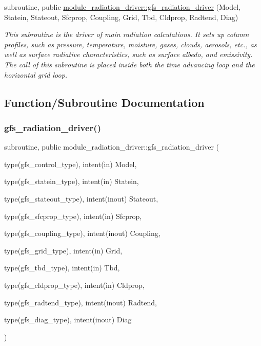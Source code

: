 \begin{DoxyCompactItemize}
\item 
subroutine, public \hyperlink{group__module__radiation__driver_ga9c5872d3bd177315e79977d40245a99a}{module\+\_\+radiation\+\_\+driver\+::gfs\+\_\+radiation\+\_\+driver} (Model, Statein, Stateout, Sfcprop, Coupling, Grid, Tbd, Cldprop, Radtend, Diag)
\begin{DoxyCompactList}\small\item\em This subroutine is the driver of main radiation calculations. It sets up column profiles, such as pressure, temperature, moisture, gases, clouds, aerosols, etc., as well as surface radiative characteristics, such as surface albedo, and emissivity. The call of this subroutine is placed inside both the time advancing loop and the horizontal grid loop. \end{DoxyCompactList}\end{DoxyCompactItemize}


\subsection{Function/\+Subroutine Documentation}
\mbox{\label{group__module__radiation__driver_ga9c5872d3bd177315e79977d40245a99a}} 
\subsubsection{\texorpdfstring{gfs\+\_\+radiation\+\_\+driver()}{gfs\_radiation\_driver()}}
{\footnotesize\ttfamily subroutine, public module\+\_\+radiation\+\_\+driver\+::gfs\+\_\+radiation\+\_\+driver (\begin{DoxyParamCaption}\item[{type(gfs\+\_\+control\+\_\+type), intent(in)}]{Model,  }\item[{type(gfs\+\_\+statein\+\_\+type), intent(in)}]{Statein,  }\item[{type(gfs\+\_\+stateout\+\_\+type), intent(inout)}]{Stateout,  }\item[{type(gfs\+\_\+sfcprop\+\_\+type), intent(in)}]{Sfcprop,  }\item[{type(gfs\+\_\+coupling\+\_\+type), intent(inout)}]{Coupling,  }\item[{type(gfs\+\_\+grid\+\_\+type), intent(in)}]{Grid,  }\item[{type(gfs\+\_\+tbd\+\_\+type), intent(in)}]{Tbd,  }\item[{type(gfs\+\_\+cldprop\+\_\+type), intent(in)}]{Cldprop,  }\item[{type(gfs\+\_\+radtend\+\_\+type), intent(inout)}]{Radtend,  }\item[{type(gfs\+\_\+diag\+\_\+type), intent(inout)}]{Diag }\end{DoxyParamCaption})}


